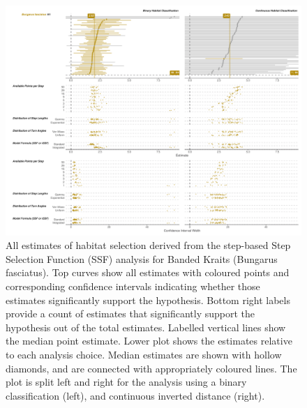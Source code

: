 \documentclass[10pt,a4paper]{article}
\begin{document}
\begin{figure}
\includegraphics[width=1\linewidth]{../../figures/specCurve_Bungarus fasciatus_ssf} \caption{All estimates of habitat selection derived from the step-based Step Selection Function (SSF) analysis for Banded Kraits (Bungarus fasciatus). Top curves show all estimates with coloured points and corresponding confidence intervals indicating whether those estimates significantly support the hypothesis. Bottom right labels provide a count of estimates that significantly support the hypothesis out of the total estimates. Labelled vertical lines show the median point estimate. Lower plot shows the estimates relative to each analysis choice. Median estimates are shown with hollow diamonds, and are connected with appropriately coloured lines. The plot is split left and right for the analysis using a binary classification (left), and continuous inverted distance (right).}\label{fig:specCurveSsfBUFA}
\end{figure}
\end{document}
